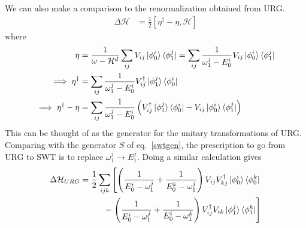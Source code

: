 \documentclass[twoside,11pt]{report}
\numberwithin{equation}{section}
\begin{document}
\\\\We can also make a comparison to the renormalization obtained from URG.
\begin{equation}\begin{aligned}
	\Delta \mathcal{H} &= \frac{1}{2}\left[\eta^\dagger - \eta,\mathcal{H}\right]
\end{aligned}\end{equation}
where 
\begin{equation}\begin{aligned}
\eta &= \frac{1}{\omega - \mathcal{H}^d}\sum_{ij}V_{ij}\ket{\phi_0^i}\bra{\phi_1^j} = \sum_{ij}\frac{1}{\omega_1^j - E_0^i}V_{ij}\ket{\phi_0^i}\bra{\phi_1^j}\\
\implies \eta^\dagger &= \sum_{ij}\frac{1}{\omega_1^j - E_0^i}V^\dagger_{ij}\ket{\phi_1^j}\bra{\phi_0^i}\\
\implies \eta^\dagger - \eta &= \sum_{ij}\frac{1}{\omega_1^j - E_0^i}\left(V^\dagger_{ij}\ket{\phi_1^j}\bra{\phi_0^i} - V_{ij}\ket{\phi_0^i}\bra{\phi_1^j}\right)\\
\end{aligned}\end{equation}
This can be thought of as the generator for the unitary transformations of URG. Comparing with the generator \(S\) of eq.~\ref{swtgen}, the prescription to go from URG to SWT is to replace \(\omega_1^j \to E_1^j\). Doing a similar calculation gives
\begin{equation}\begin{aligned}
	\Delta \mathcal{H}_{URG} = \frac{1}{2} \sum_{ijk}\left[\left(\frac{1}{E_0^i - \omega_1^j} + \frac{1}{E_0^k - \omega_1^j}\right)V_{ij}V^\dagger_{kj}\ket{\phi_0^i}\bra{\phi_0^k}\right.\\
	- \left.\left(\frac{1}{E_0^i - \omega_1^j} + \frac{1}{E_0^i - \omega_1^k}\right)V^\dagger_{ij}V_{ik}\ket{\phi_1^j}\bra{\phi_1^k}\right]\\
\end{aligned}\end{equation}
\end{document}
